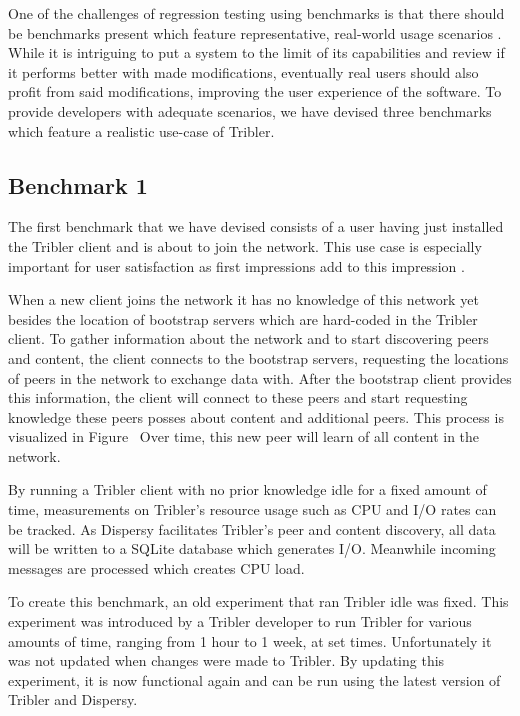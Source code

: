 One of the challenges of regression testing using benchmarks is that there should be benchmarks present which feature representative, real-world usage scenarios \cite{ferre2001usability}.
While it is intriguing to put a system to the limit of its capabilities and review if it performs better with made modifications, eventually real users should also profit from said modifications, improving the user experience of the software.
To provide developers with adequate scenarios, we have devised three benchmarks which feature a realistic use-case of Tribler.

\subsection{Benchmark 1}

The first benchmark that we have devised consists of a user having just installed the Tribler client and is about to join the network.
This use case is especially important for user satisfaction as first impressions add to this impression \cite{ferre2001usability}.

When a new client joins the network it has no knowledge of this network yet besides the location of bootstrap servers which are hard-coded in the Tribler client.
To gather information about the network and to start discovering peers and content, the client connects to the bootstrap servers, requesting the locations of peers in the network to exchange data with.
After the bootstrap client provides this information, the client will connect to these peers and start requesting knowledge these peers posses about content and additional peers.
This process is visualized in Figure~ 
Over time, this new peer will learn of all content in the network.

By running a Tribler client with no prior knowledge idle for a fixed amount of time, measurements on Tribler's resource usage such as CPU and I/O rates can be tracked.
As Dispersy facilitates Tribler's peer and content discovery, all data will be written to a SQLite database which generates I/O.
Meanwhile incoming messages are processed which creates CPU load.

To create this benchmark, an old experiment that ran Tribler idle was fixed.
This experiment was introduced by a Tribler developer to run Tribler for various amounts of time, ranging from 1 hour to 1 week, at set times.
Unfortunately it was not updated when changes were made to Tribler.
By updating this experiment, it is now functional again and can be run using the latest version of Tribler and Dispersy.

